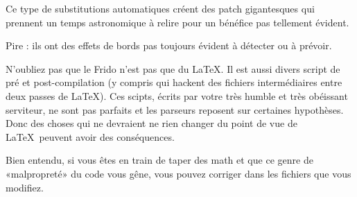 Ce type de substitutions automatiques créent des patch gigantesques qui prennent un temps astronomique à relire pour un bénéfice pas tellement évident.

Pire : ils ont des effets de bords pas toujours évident à détecter ou à prévoir.

N'oubliez pas que le Frido n'est pas que du \LaTeX. Il est aussi divers script de pré et post-compilation (y compris qui hackent des fichiers intermédiaires entre deux passes de \LaTeX). Ces scipts, écrits par votre très humble et très obéissant serviteur, ne sont pas parfaits et les parseurs reposent sur certaines hypothèses. Donc des choses qui ne devraient ne rien changer du point de vue de \LaTeX\ peuvent avoir des conséquences.

Bien entendu, si vous êtes en train de taper des math et que ce genre de «malpropreté» du code vous gêne, vous pouvez corriger dans les fichiers que vous modifiez.
